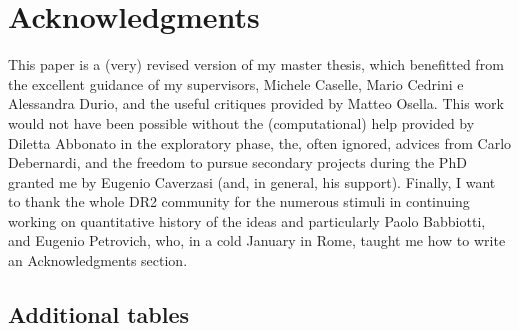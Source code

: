 \documentclass[a4paper, 11pt, headings=standardclasses, tablecaptionsbelow]{scrartcl}
\begin{document}
\section*{Acknowledgments}
This paper is a (very) revised version of my master thesis, which benefitted from the excellent guidance of my supervisors, Michele Caselle, Mario Cedrini e Alessandra Durio, and the useful critiques provided by Matteo Osella.
This work would not have been possible without the (computational) help provided by Diletta Abbonato in the exploratory phase, the, often ignored, advices from Carlo Debernardi, and the freedom to pursue secondary projects during the PhD granted me by Eugenio Caverzasi (and, in general, his support).
Finally, I want to thank the whole DR2 community for the numerous stimuli in continuing working on quantitative history of the ideas and particularly Paolo Babbiotti, and Eugenio Petrovich, who, in a cold January in Rome, taught me how to write an Acknowledgments section.

\clearpage
\begin{refcontext}[sorting=nyt]
  \printbibliography
\end{refcontext}
\clearpage

\begin{appendices}
  \section{Additional tables}
  \begin{landscape}
    
  \end{landscape}

\end{appendices}
\end{document}
